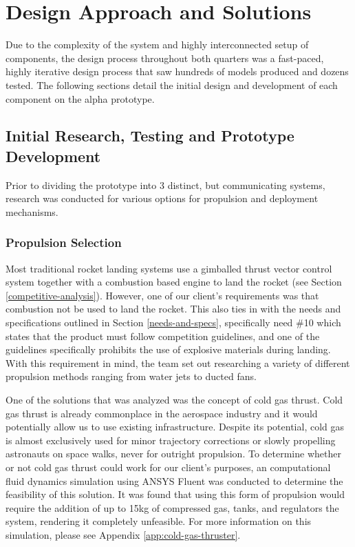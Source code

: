 \chapter{Design Approach and Solutions}
\label{design-approach}
Due to the complexity of the system and highly interconnected setup of components, the design process throughout both quarters was a fast-paced, highly iterative design process that saw hundreds of models produced and dozens tested. The following sections detail the initial design and development of each component on the alpha prototype.

\section{Initial Research, Testing and Prototype Development}
Prior to dividing the prototype into 3 distinct, but communicating systems, research was conducted for various options for propulsion and deployment mechanisms. 

\subsection{Propulsion Selection}
Most traditional rocket landing systems use a gimballed thrust vector control system together with a combustion based engine to land the rocket (see Section \ref{competitive-analysis}). However, one of our client's requirements was that combustion not be used to land the rocket. This also ties in with the needs and specifications outlined in Section \ref{needs-and-specs}, specifically need \#10 which states that the product must follow competition guidelines, and one of the guidelines specifically prohibits the use of explosive materials during landing. With this requirement in mind, the team set out researching a variety of different propulsion methods ranging from water jets to ducted fans. 

One of the solutions that was analyzed was the concept of cold gas thrust. Cold gas thrust is already commonplace in the aerospace industry and it would potentially allow us to use existing infrastructure. Despite its potential, cold gas is almost exclusively used for minor trajectory corrections or slowly propelling astronauts on space walks, never for outright propulsion. To determine whether or not cold gas thrust could work for our client's purposes, an computational fluid dynamics simulation using ANSYS Fluent was conducted to determine the feasibility of this solution. It was found that using this form of propulsion would require the addition of up to 15kg of compressed gas, tanks, and regulators the system, rendering it completely unfeasible. For more information on this simulation, please see Appendix \ref{app:cold-gas-thruster}.

